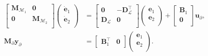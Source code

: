 \begin{equation*}
\begin{aligned}
\begin{bmatrix}
\mathbf{M}_{\mathcal{M}_1} & \mathbf{0} \\
\mathbf{0} & \mathbf{M}_{\mathcal{M}_2} \\
\end{bmatrix}
\begin{pmatrix}
\dot{\mathbf{e}}_{1} \\
\dot{\mathbf{e}}_{2} \\
\end{pmatrix}
&= \begin{bmatrix}
\mathbf{0} & - \mathbf{D}_{\mathcal{L}}^\top \\
\mathbf{D}_{\mathcal{L}} & \mathbf{0} \\
\end{bmatrix} 
\begin{pmatrix}
\mathbf{e}_{1} \\
\mathbf{e}_{2} \\
\end{pmatrix} + 
\begin{bmatrix}
\mathbf{B}_1\\
\mathbf{0}\\
\end{bmatrix}
\mathbf{u}_\partial, \\
\mathbf{M}_\partial {\mathbf{y}_\partial} &= \begin{bmatrix}
\mathbf{B}_1^\top & \mathbf{0}
\end{bmatrix}\begin{pmatrix}
\mathbf{e}_{1} \\
\mathbf{e}_{2} \\
\end{pmatrix}.
\end{aligned}
\end{equation*}

